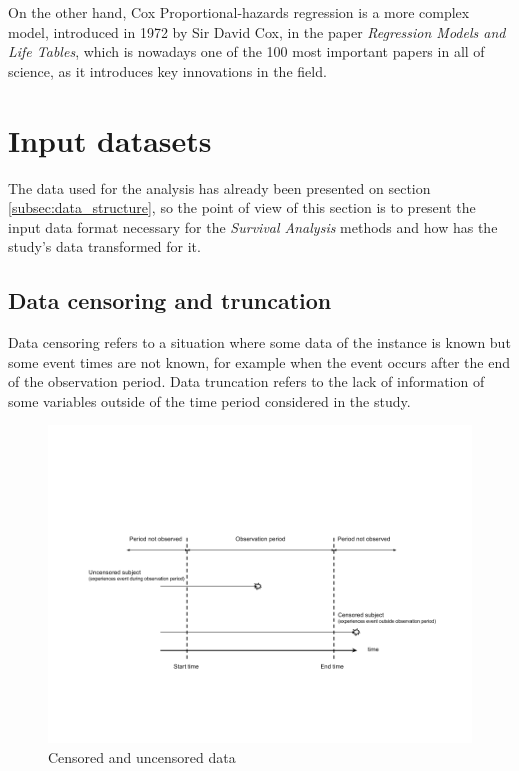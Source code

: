 \documentclass[11pt]{book} %
\begin{document}
    On the other hand, Cox Proportional-hazards regression is a more complex model, introduced in 1972 by Sir David Cox, in the paper \emph{Regression Models and Life Tables}, which is nowadays one of the 100 most important papers in all of science, as it introduces key innovations in the field.

  \section{Input datasets}

    The data used for the analysis has already been presented on section \ref{subsec:data_structure}, so the point of view of this section is to present the input data format necessary for the \emph{Survival Analysis} methods and how has the study's data transformed for it.

    \subsection{Data censoring and truncation}
      \label{subsubsec:censoring}

      Data censoring refers to a situation where some data of the instance is known but some event times are not known, for example when the event occurs after the end of the observation period. Data truncation refers to the lack of information of some variables outside of the time period considered in the study.

      \begin{figure}[!ht]
        \includegraphics[width=\textwidth]{Data_censoring.png}
        \caption{Censored and uncensored data}
        \label{img:data_censoring}
      \end{figure}
\end{document}
